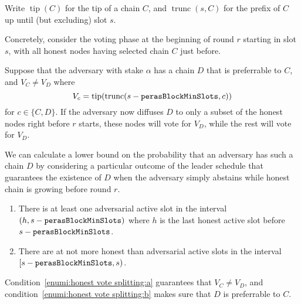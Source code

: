 Write $\operatorname{tip}(C)$ for the tip of a chain $C$, and $\operatorname{trunc}(s,C)$ for the prefix of $C$ up until (but excluding) slot $s$.

Concretely, consider the voting phase at the beginning of round $r$ starting in slot $s$, with all honest nodes having selected chain $C$ just before.

Suppose that the adversary with stake $\alpha$ has a chain $D$ that is preferrable to $C$, and $V_C \neq V_D$ where \[V_c = \operatorname{tip}(\operatorname{trunc}(s-\mathtt{perasBlockMinSlots},c))\] for $c\in\{C,D\}$.
If the adversary now diffuses $D$ to only a subset of the honest nodes right before $r$ starts, these nodes will vote for $V_D$, while the rest will vote for $V_D$.

We can calculate a lower bound on the probability that an adversary has such a chain $D$ by considering a particular outcome of the leader schedule that guarantees the existence of $D$ when the adversary simply abstains while honest chain is growing before round $r$.

\begin{enumerate}
\item\label{enumi:honest vote splitting:a}
  There is at least one adversarial active slot in the interval $(h,s-\mathtt{perasBlockMinSlots})$ where $h$ is the last honest active slot before $s-\mathtt{perasBlockMinSlots}$.
\item\label{enumi:honest vote splitting:b}
  There are at not more honest than adversarial active slots in the interval $[s-\mathtt{perasBlockMinSlots}, s)$.
\end{enumerate}
Condition~\ref{enumi:honest vote splitting:a} guarantees that $V_C\neq V_D$, and condition~\ref{enumi:honest vote splitting:b} makes sure that $D$ is preferrable to $C$.

